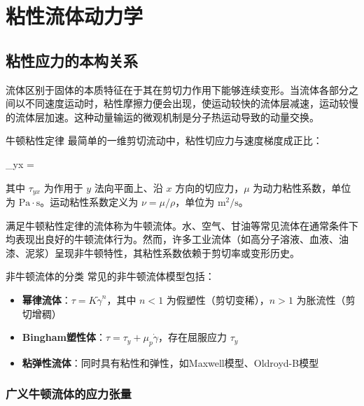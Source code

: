 \chapter{粘性流体动力学}


\section{粘性应力的本构关系}

流体区别于固体的本质特征在于其在剪切力作用下能够连续变形。当流体各部分之间以不同速度运动时，粘性摩擦力便会出现，使运动较快的流体层减速，运动较慢的流体层加速。这种动量输运的微观机制是分子热运动导致的动量交换。

\begin{mydefinition}{牛顿粘性定律}
最简单的一维剪切流动中，粘性切应力与速度梯度成正比：
\begin{myformula}
    \tau_{yx} = \mu {}
\end{myformula}
其中 $\tau_{yx}$ 为作用于 $y$ 法向平面上、沿 $x$ 方向的切应力，$\mu$ 为动力粘性系数，单位为 $\mathrm{Pa\cdot s}$。运动粘性系数定义为 $\nu = \mu/\rho$，单位为 $\mathrm{m^2/s}$。
\end{mydefinition}

满足牛顿粘性定律的流体称为牛顿流体。水、空气、甘油等常见流体在通常条件下均表现出良好的牛顿流体行为。然而，许多工业流体（如高分子溶液、血液、油漆、泥浆）呈现非牛顿特性，其粘性系数依赖于剪切率或变形历史。

\begin{mydefinition}{非牛顿流体的分类}
常见的非牛顿流体模型包括：
\begin{itemize}
    \item \textbf{幂律流体}：$\tau = K\dot{\gamma}^{n}$，其中 $n<1$ 为假塑性（剪切变稀），$n>1$ 为胀流性（剪切增稠）
    \item \textbf{Bingham塑性体}：$\tau = \tau_y + \mu_p\dot{\gamma}$，存在屈服应力 $\tau_y$
    \item \textbf{粘弹性流体}：同时具有粘性和弹性，如Maxwell模型、Oldroyd-B模型
\end{itemize}
\end{mydefinition}

\subsection{广义牛顿流体的应力张量}

